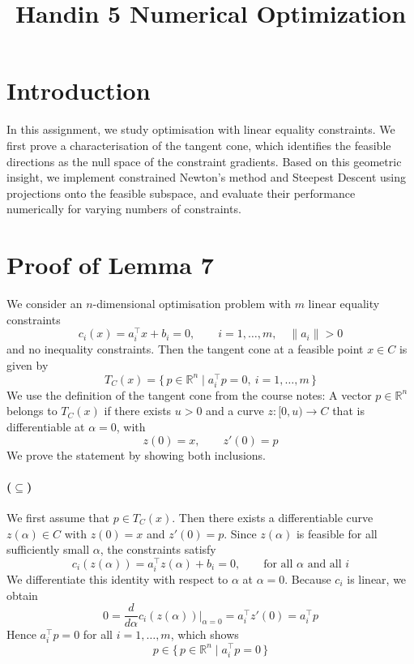 \documentclass[11pt,a4paper]{article}
\title{\LARGE \textbf{Handin 5 Numerical Optimization}}
\date{}
\begin{document}
\maketitle


\section{Introduction}

In this assignment, we study optimisation with linear equality constraints. 
We first prove a characterisation of the tangent cone, which identifies the feasible directions as the null space of the constraint gradients. Based on this geometric insight, we implement constrained Newton's method and Steepest Descent using projections onto the feasible subspace, and evaluate their performance numerically for varying numbers of constraints.

\section{Proof of Lemma 7}

We consider an $n$-dimensional optimisation problem with $m$ linear equality constraints
\[
c_i(x)=a_i^\top x + b_i = 0,\qquad i=1,\dots,m,\quad \|a_i\|>0
\]
and no inequality constraints. Then the tangent cone at a feasible point $x \in C$ is given by
\[
T_C(x)=\{\,p\in\mathbb{R}^n \mid a_i^\top p = 0,\ i=1,\dots,m\,\}
\]
We use the definition of the tangent cone from the course notes:  
A vector $p \in \mathbb{R}^n$ belongs to $T_C(x)$ if there exists $u>0$ and a curve 
$z:[0,u)\to C$ that is differentiable at $\alpha=0$, with
\[
z(0)=x, \qquad z'(0)=p
\]
We prove the statement by showing both inclusions.

\paragraph{($\subseteq$)} 
We first assume that $p \in T_C(x)$.  
Then there exists a differentiable curve $z(\alpha)\in C$ with $z(0)=x$ and $z'(0)=p$.  
Since $z(\alpha)$ is feasible for all sufficiently small $\alpha$, the constraints satisfy
\[
c_i(z(\alpha)) = a_i^\top z(\alpha) + b_i = 0,
\qquad \text{for all } \alpha \text{ and all } i
\]
We differentiate this identity with respect to $\alpha$ at $\alpha=0$. Because $c_i$ is linear, we obtain
\[
0 
= \frac{d}{d\alpha} c_i(z(\alpha))\Big|_{\alpha=0}
= a_i^\top z'(0)
= a_i^\top p
\]
Hence $a_i^\top p=0$ for all $i=1,\dots,m$, which shows
\[
p \in \{\,p \in \mathbb{R}^n \mid a_i^\top p = 0 \,\}
\]
\end{document}

